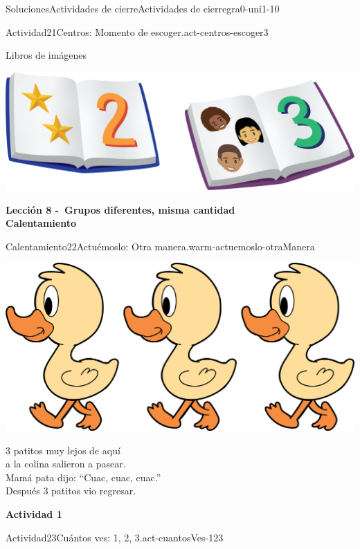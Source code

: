 \documentclass[twoside,10pt,]{article}
\begin{document}
\begin{solutions-section}{Soluciones}{Actividades de cierre}{}{Actividades de cierre}{}{}{gra0-uni1-10}
\begin{activitysolution}{Actividad}{21}{Centros: Momento de escoger.}{act-centros-escoger3}
\begin{sidebyside}{2}{0.025}{0.025}{0.05}
\begin{sbspanel}{0.45}%
Libros de imágenes%
\par
\includegraphics[width=\linewidth]{external/png-source/K.1.D Beta Student Workbooks.Books.png}
\end{sbspanel}%
\end{sidebyside}%
\end{activitysolution}%
\par\medskip
\noindent\textbf{\large{}\space\textperiodcentered\space{}Lección 8 -~Grupos diferentes, misma cantidad\\
\space\textperiodcentered\space{}Calentamiento}
\begin{explorationsolution}{Calentamiento}{22}{Actuémoslo: Otra manera.}{warm-actuemoslo-otraManera}%
\begin{image}{0.2}{0.6}{0.2}{}%
\includegraphics[width=\linewidth]{external/png-source/3 ducks.png}
\end{image}%
%
\par
3 patitos muy lejos de aquí\\
 a la colina salieron a pasear.\\
 Mamá pata dijo: “Cuac, cuac, cuac.”\\
 Después 3 patitos vio regresar.%
\end{explorationsolution}%
\par\medskip
\noindent\textbf{\large{}\space\textperiodcentered\space{}Actividad 1}
\begin{activitysolution}{Actividad}{23}{Cuántos ves: 1, 2, 3.}{act-cuantosVes-123}%

\end{activitysolution}
\end{solutions-section}
\end{document}

